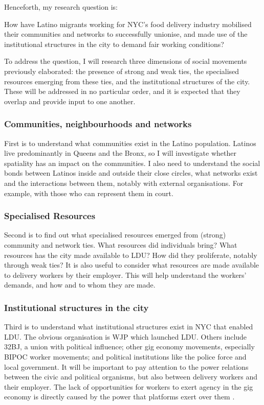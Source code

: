 \documentclass{article}[12pt]
\begin{document}
Henceforth, my research question is:

\begin{center}
How have Latino migrants working for NYC's food delivery industry mobilised their communities and networks to successfully unionise, and made use of the institutional structures in the city to demand fair working conditions?
\end{center}

To address the question, I will research three dimensions of social movements previously elaborated: the presence of strong and weak ties, the specialised resources emerging from these ties, and the institutional structures of the city. 
These will be addressed in no particular order, and it is expected that they overlap and provide input to one another.

\subsubsection{Communities, neighbourhoods and networks}

First is to understand what communities exist in the Latino population. Latinos live predominantly in Queens and the Bronx, so I will investigate whether spatiality has an impact on the communities. I also need to understand the social bonds between Latinos inside and outside their close circles, what networks exist and the interactions between them, notably with external organisations. For example, with those who can represent them in court.

\subsubsection{Specialised Resources}

Second is to find out what specialised resources emerged from (strong) community and network ties. What resources did individuals bring? What resources has the city made available to LDU? How did they proliferate, notably through weak ties?
It is also useful to consider what resources are made available to delivery workers by their employer. This will help understand the workers' demands, and how and to whom they are made.

\subsubsection{Institutional structures in the city}

Third is to understand what institutional structures exist in NYC that enabled LDU. The obvious organisation is WJP which launched LDU. Others include 32BJ, a union with political influence; other gig economy movements, especially BIPOC worker movements; and political institutions like the police force and local government. It will be important to pay attention to the power relations between the civic and political organisms, but also between delivery workers and their employer.
The lack of opportunities for workers to exert agency in the gig economy is directly caused by the power that platforms exert over them \parencite{anwar2020hidden}.
\end{document}
